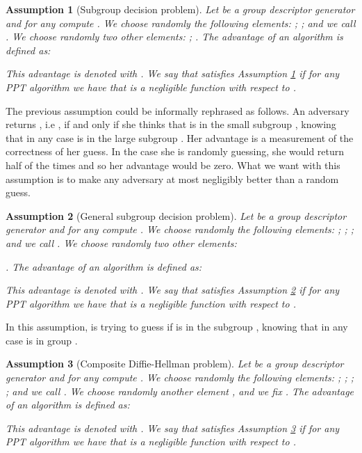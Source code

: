 \documentclass[a4paper,10pt]{article}
\newtheorem{assumption}{Assumption}
\begin{document}
	\begin{assumption}[Subgroup decision problem]
		\label{a1}
		Let  be a group descriptor generator and for any  compute .
		We choose randomly the following elements:
			;
			;
and we call . 
		We choose randomly two other elements:
			;
			.
		The advantage of an algorithm  is defined as:
		
		This advantage is denoted with .
		We say that  satisfies Assumption \ref{a1} if for any PPT algorithm  we have that  is a negligible function with respect to .
	\end{assumption}
	\noindent The previous assumption could be informally rephrased as follows.
An adversary  returns , i.e , if and only if she thinks that  is 
in the small subgroup , knowing that in any case  is in the large subgroup .
Her advantage is a measurement of the correctness of her guess.
In the case she is randomly guessing, she would return  half of the times and so her advantage
would be zero. What we want with this assumption is to make any adversary at most negligibly better than a random guess.
	\begin{assumption}[General subgroup decision problem]
		\label{a2}
		Let  be a group descriptor generator and for any  compute . 
		We choose randomly the following elements:
			;
			;
			;
		and we call \linebreak .
		We choose randomly two other elements:
			
			.
		The advantage of an algorithm  is defined as:
		
		This advantage is denoted with .
		We say that  satisfies Assumption \ref{a2} if for any PPT algorithm  we have that  is a negligible function with respect to .
	\end{assumption}
	\noindent In this assumption,  is trying to guess if  is  in the subgroup , knowing that in any case  is in  group .
	\begin{assumption}[Composite Diffie-Hellman problem]
		\label{a3}
		Let  be a group descriptor generator and for any  compute .
		We choose randomly the following elements:
			;
			;
			;
			;
		and we call \linebreak 
		. 
		We choose randomly another element
			,
		and we fix .
		The advantage of an algorithm  is defined as:
		
		This advantage is denoted with .
		We say that  satisfies Assumption \ref{a3} if for any PPT algorithm  we have that  is a negligible function with respect to .
	\end{assumption}
	
\end{document}
